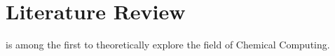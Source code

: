 \chapter{Literature Review}
\cite{Turing1952} is among the first to theoretically explore the field of Chemical Computing. 
